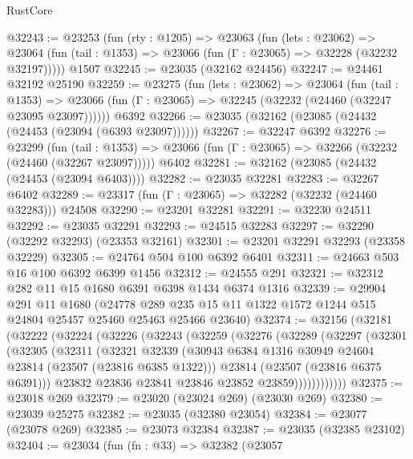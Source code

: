 \begin{lexlean}{RustCore}
\begin{coremodule}
@32243 := @23253
    (fun (rty : @1205) =>
    @23063
      (fun (lets : @23062) =>
      @23064 (fun (tail : @1353) => @23066 (fun (Γ : @23065) => @32228 (@32232 @32197)))))
    @1507
@32245 := @23035 (@32162 @24456)
@32247 := @24461 @32192 @25190
@32259 := @23275
    (fun (lets : @23062) =>
    @23064
      (fun (tail : @1353) =>
      @23066 (fun (Γ : @23065) => @32245 (@32232 (@24460 (@32247 @23095 @23097))))))
    @6392
@32266 := @23035 (@32162 (@23085 (@24432 (@24453 (@23094 (@6393 @23097))))))
@32267 := @32247 @6392
@32276 := @23299
    (fun (tail : @1353) => @23066 (fun (Γ : @23065) => @32266 (@32232 (@24460 (@32267 @23097)))))
    @6402
@32281 := @32162 (@23085 (@24432 (@24453 (@23094 @6403))))
@32282 := @23035 @32281
@32283 := @32267 @6402
@32289 := @23317 (fun (Γ : @23065) => @32282 (@32232 (@24460 @32283))) @24508
@32290 := @23201 @32281
@32291 := @32230 @24511
@32292 := @23035 @32291
@32293 := @24515 @32283
@32297 := @32290 (@32292 @32293) (@23353 @32161)
@32301 := @23201 @32291 @32293 (@23358 @32229)
@32305 := @24764 @504 @100 @6392 @6401
@32311 := @24663 @503 @16 @100 @6392 @6399 @1456
@32312 := @24555 @291
@32321 := @32312 @282 @11 @15 @1680 @6391 @6398 @1434 @6374 @1316
@32339 := @29904
    @291
    @11
    @1680
    (@24778 @289 @235 @15 @11 @1322 @1572 @1244 @515 @24804 @25457 @25460 @25463 @25466 @23640)
@32374 := @32156
    (@32181
      (@32222
        (@32224
          (@32226
            (@32243
              (@32259
                (@32276
                  (@32289
                    (@32297
                      (@32301
                        (@32305
                          (@32311
                            (@32321
                              @32339
                              (@30943
                                @6384
                                @1316
                                @30949
                                @24604
                                @23814
                                (@23507 (@23816 @6385 @1322)))
                              @23814
                              (@23507 (@23816 @6375 @6391)))
                            @23832
                            @23836
                            @23841
                            @23846
                            @23852
                            @23859))))))))))))
@32375 := @23018 @269
@32379 := @23020 (@23024 @269) (@23030 @269)
@32380 := @23039 @25275
@32382 := @23035 (@32380 @23054)
@32384 := @23077 (@23078 @269)
@32385 := @23073 @32384
@32387 := @23035 (@32385 @23102)
@32404 := @23034
    (fun (fn : @33) =>
    @32382
      (@23057

\end{coremodule}
\end{lexlean}
